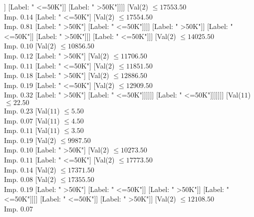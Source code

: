 \documentclass[margin=10pt]{standalone}
\begin{document}
\begin{forest}
																						[Val($2$) $ \leq 17195.50$ \\ Imp. $0.81$
																							[Label: " <=50K"]
																							[Label: " >50K"]]
																						[Label: " <=50K"]]
																					[Label: " >50K"]]]]
																		[Val($2$) $ \leq 17553.50$ \\ Imp. $0.14$
																			[Label: " <=50K"]
																			[Val($2$) $ \leq 17554.50$ \\ Imp. $0.81$
																				[Label: " >50K"]
																				[Label: " <=50K"]]]]
																	[Label: " >50K"]]
																[Label: " <=50K"]]
															[Label: " >50K"]]]
													[Label: " <=50K"]]]
											[Val($2$) $ \leq 14025.50$ \\ Imp. $0.10$
												[Val($2$) $ \leq 10856.50$ \\ Imp. $0.12$
													[Label: " >50K"]
													[Val($2$) $ \leq 11706.50$ \\ Imp. $0.11$
														[Label: " <=50K"]
														[Val($2$) $ \leq 11851.50$ \\ Imp. $0.18$
															[Label: " >50K"]
															[Val($2$) $ \leq 12886.50$ \\ Imp. $0.19$
																[Label: " <=50K"]
																[Val($2$) $ \leq 12909.50$ \\ Imp. $0.32$
																	[Label: " >50K"]
																	[Label: " <=50K"]]]]]]
												[Label: " <=50K"]]]]]]]
						[Val($11$) $ \leq 22.50$ \\ Imp. $0.23$
							[Val($11$) $ \leq 5.50$ \\ Imp. $0.07$
								[Val($11$) $ \leq 4.50$ \\ Imp. $0.11$
									[Val($11$) $ \leq 3.50$ \\ Imp. $0.19$
										[Val($2$) $ \leq 9987.50$ \\ Imp. $0.10$
											[Label: " >50K"]
											[Val($2$) $ \leq 10273.50$ \\ Imp. $0.11$
												[Label: " <=50K"]
												[Val($2$) $ \leq 17773.50$ \\ Imp. $0.14$
													[Val($2$) $ \leq 17371.50$ \\ Imp. $0.08$
														[Val($2$) $ \leq 17355.50$ \\ Imp. $0.19$
															[Label: " >50K"]
															[Label: " <=50K"]]
														[Label: " >50K"]]
													[Label: " <=50K"]]]]
										[Label: " <=50K"]]
									[Label: " >50K"]]
								[Val($2$) $ \leq 12108.50$ \\ Imp. $0.07$

\end{forest}
\end{document}
